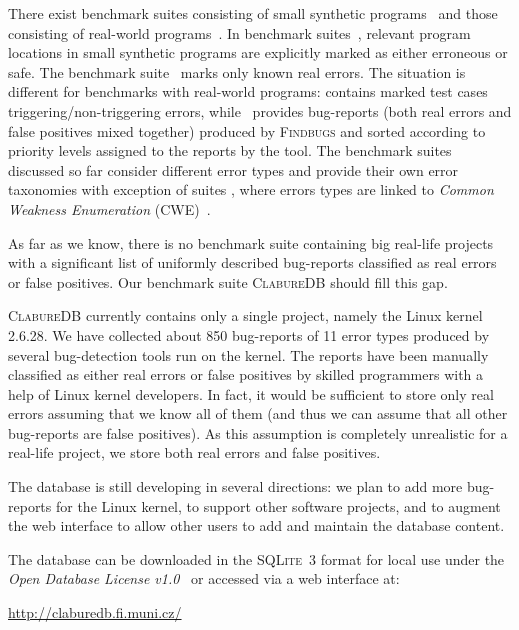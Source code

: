 \documentclass[10pt]{llncs}
\newcommand\cdb{\textsc{ClabureDB}\xspace}
\begin{document}
There exist benchmark suites consisting of small synthetic
programs~\cite{CHK11,CHK09,KRA05,NCH05,SRD} and those consisting of
real-world programs~\cite{CHK09,HW08,LLQ05}. In benchmark
suites~\cite{CHK11,KRA05,NCH05}, relevant program locations in small
synthetic programs are explicitly marked as either erroneous or safe. The
benchmark suite~\cite{CHK09} marks only known real errors. The situation is
different for benchmarks with real-world programs: \cite{LLQ05} contains
marked test cases triggering/non-triggering errors, while~\cite{HW08}
provides bug-reports (both real errors and false positives mixed together)
produced by \textsc{Findbugs} and sorted
according to priority levels assigned to the reports by the tool. The
benchmark suites discussed so far consider different error types and provide
their own error taxonomies with exception of suites \cite{CHK11,CHK09},
where errors types are linked to \emph{Common Weakness Enumeration}
(\textsc{CWE})~\cite{cwe}.

As far as we know, there is no benchmark suite containing big real-life
projects with a significant list of uniformly described bug-reports
classified as real errors or false positives. Our benchmark suite \cdb
should fill this gap.

\cdb currently contains only a single project, namely the Linux kernel
2.6.28. We have collected about 850 bug-reports of 11 error types produced
by several bug-detection tools run on the kernel. The reports have been
manually classified as either real errors or false positives by skilled
programmers with a help of Linux kernel developers. In fact, it would be
sufficient to store only real errors assuming that we know all of them (and
thus we can assume that all other bug-reports are false positives). As this
assumption is completely unrealistic for a real-life project, we store both
real errors and false positives.

The database is still developing in several directions: we plan to add more
bug-reports for the Linux kernel, to support other software projects, and to
augment the web interface to allow other users to add and maintain the
database content.

The database can be downloaded in the \textsc{SQLite~3} format for local use
under the \emph{Open Database License v1.0}~\cite{ODbL} or accessed via a web
interface at:
\begin{center}
  \url{http://claburedb.fi.muni.cz/}
\end{center}
\end{document}
